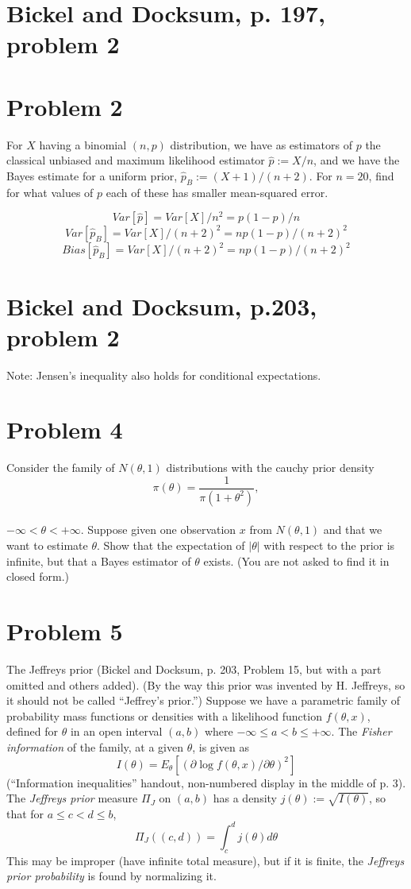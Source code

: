 \documentclass[11pt]{article}
\newcommand{\ProbS}{\iftrue}
\newcommand{\ProbE}{\fi}
\begin{document}
\section{Bickel and Docksum, p. 197, problem 2}

\section{Problem 2}
\ProbS
For $X$ having a binomial $(n,p)$ distribution, we have as estimators of $p$ the classical unbiased and maximum likelihood estimator
$
\hat{p} := X/n
$, and we have the Bayes estimate for a uniform prior,
$
\hat{p}_B := (X+1)/(n+2)
$. For $n=20$, find for what values of $p$ each of these has smaller mean-squared error.
\ProbE

$$
Var[\hat{p}] = Var[X] / n^2 = p(1-p)/n
$$
$$
Var[\hat{p}_B] = Var[X] / (n+2)^2 = np(1-p)/(n+2)^2
$$
$$
Bias[\hat{p}_B] = Var[X] / (n+2)^2 = np(1-p)/(n+2)^2
$$
\section{Bickel and Docksum, p.203, problem 2}
\ProbS
Note: Jensen's inequality also holds for conditional expectations.
\ProbE

\section{Problem 4}
\ProbS
Consider the family of $N(\theta, 1)$ distributions with the cauchy prior density
$$
\pi(\theta) = \frac{1}{\pi(1+\theta^2)},
$$
\\
$-\infty < \theta < +\infty$.
Suppose given one observation $x$ from $N(\theta, 1)$
and that we want to estimate $\theta$.
Show that the expectation of $|\theta|$ with respect to the prior is infinite, but that a Bayes estimator of $\theta$ exists.
(You are not asked to find it in closed form.)
\ProbE

\section{Problem 5}
\ProbS
The Jeffreys prior (Bickel and Docksum, p. 203, Problem 15, but with a part omitted and others added). (By the way this prior was invented by H. Jeffreys, so it should not be called ``Jeffrey's prior.'')
Suppose we have a parametric family of probability mass functions or densities with a likelihood function $f(\theta, x)$, defined for $\theta$ in an open interval $(a,b)$ where $-\infty \leq a < b \leq +\infty$.
The \emph{Fisher information} of the family, at a given $\theta$, is given as
$$
I(\theta) = E_{\theta}[(\partial \log f(\theta, x) / \partial \theta)^2]
$$
(``Information inequalities'' handout, non-numbered display in the middle of p. 3). The \emph{Jeffreys prior} measure $\Pi_{J}$ on $(a,b)$ has a density
$
j(\theta) := \sqrt{I(\theta)}
$, so that for
$a \leq c < d \leq b$,
$$
\Pi_{J}((c,d)) = \int_{c}^{d} j(\theta) d\theta
$$
This may be improper (have infinite total measure), but if it is finite, the \emph{Jeffreys prior probability} is found by normalizing it.
\ProbE
\end{document}
